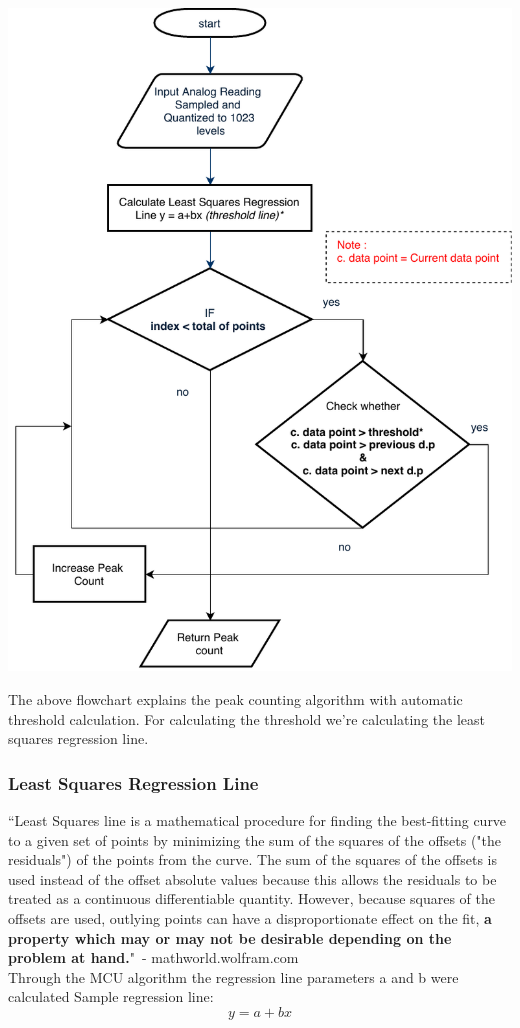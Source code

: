 \documentclass[12pt]{article}
\begin{document}
{	
		\begin{center}
		\includegraphics[scale=0.9]{peak_count}
		
		\end{center}	


	The above flowchart explains the peak counting algorithm with automatic threshold calculation. For calculating the threshold we're calculating the least squares regression line.
		
\subsubsection{Least Squares Regression Line }

``Least Squares line is a mathematical procedure for finding the best-fitting curve to a given set of points by minimizing the sum of the squares of the offsets ("the residuals") of the points from the curve. The sum of the squares of the offsets is used instead of the offset absolute values because this allows the residuals to be treated as a continuous differentiable quantity. However, because squares of the offsets are used, outlying points can have a disproportionate effect on the fit, \textbf{a property which may or may not be desirable depending on the problem at hand.}" 
\,- mathworld.wolfram.com\\Through the {MCU} algorithm the regression line parameters a and b were calculated
Sample regression line:
\begin{equation}
y = a + b x
\end{equation}

}
\end{document}

